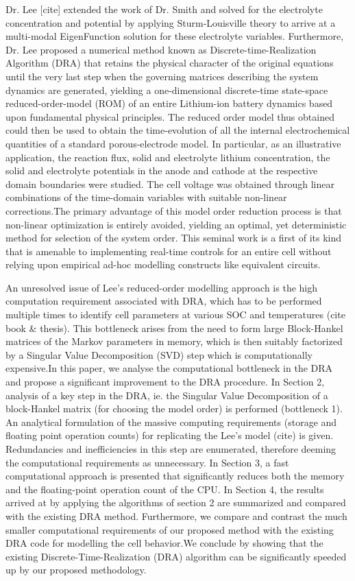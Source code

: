 Dr. Lee {[}cite{]} extended the work of Dr. Smith and solved for the
electrolyte concentration and potential by applying Sturm-Louisville
theory to arrive at a multi-modal EigenFunction solution for these
electrolyte variables. Furthermore, Dr. Lee proposed a numerical method
known as Discrete-time-Realization Algorithm (DRA) that retains the
physical character of the original equations until the very last step
when the governing matrices describing the system dynamics are generated,
yielding a one-dimensional discrete-time state-space reduced-order-model
(ROM) of an entire Lithium-ion battery dynamics based upon fundamental
physical principles. The reduced order model thus obtained could then
be used to obtain the time-evolution of all the internal electrochemical
quantities of a standard porous-electrode model. In particular, as
an illustrative application, the reaction flux, solid and electrolyte
lithium concentration, the solid and electrolyte potentials in the
anode and cathode at the respective domain boundaries were studied.
The cell voltage was obtained through linear combinations of the time-domain
variables with suitable non-linear corrections.The primary advantage
of this model order reduction process is that non-linear optimization
is entirely avoided, yielding an optimal, yet deterministic method
for selection of the system order. This seminal work is a first of
its kind that is amenable to implementing real-time controls for an
entire cell without relying upon empirical ad-hoc modelling constructs
like equivalent circuits.


An unresolved issue of Lee\textquoteright s reduced-order modelling
approach is the high computation requirement associated with DRA,
which has to be performed multiple times to identify cell parameters
at various SOC and temperatures (cite book \& thesis). This bottleneck
arises from the need to form large Block-Hankel matrices of the Markov
parameters in memory, which is then suitably factorized by a Singular
Value Decomposition (SVD) step which is computationally expensive.In
this paper, we analyse the computational bottleneck in the DRA and
propose a significant improvement to the DRA procedure. In Section
2, analysis of a key step in the DRA, ie. the Singular Value Decomposition
of a block-Hankel matrix (for choosing the model order) is performed
(bottleneck 1). An analytical formulation of the massive computing
requirements (storage and floating point operation counts) for replicating
the Lee\textquoteright s model (cite) is given. Redundancies and inefficiencies
in this step are enumerated, therefore deeming the computational requirements
as unnecessary. In Section 3, a fast computational approach is presented
that significantly reduces both the memory and the floating-point
operation count of the CPU. In Section 4, the results arrived at by
applying the algorithms of section 2 are summarized and compared with
the existing DRA method. Furthermore, we compare and contrast the
much smaller computational requirements of our proposed method with
the existing DRA code for modelling the cell behavior.We conclude
by showing that the existing Discrete-Time-Realization (DRA) algorithm
can be significantly speeded up by our proposed methodology.

